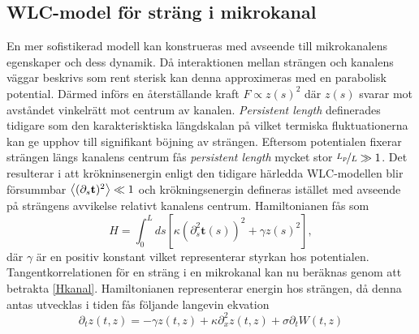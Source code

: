 \subsection{WLC-model för sträng i mikrokanal}

En mer sofistikerad modell kan konstrueras med avseende till mikrokanalens egenskaper och dess dynamik. Då interaktionen mellan strängen och kanalens väggar beskrivs som rent sterisk \cite{Koster_etal2007} kan denna approximeras med en parabolisk potential. Därmed införs en återställande kraft $F \propto z(s)^2$ där $z(s)$ svarar mot avståndet vinkelrätt mot centrum av kanalen. \emph{Persistent length} definerades tidigare som den karakterisktiska längdskalan på vilket termiska fluktuationerna kan ge upphov till signifikant böjning av strängen. Eftersom potentialen fixerar strängen längs kanalens centrum fås \emph{persistent length} mycket stor $\nicefrac{L_{p}}{L}\gg 1$. Det resulterar i att krökninsenergin enligt den tidigare härledda WLC-modellen blir försummbar \cite{PhysRevE.60.4671} $\ev{(\partial_{s}\mathbf{t})^2}\ll 1$ och  krökningsenergin defineras istället med avseende på strängens avvikelse relativt kanalens centrum. Hamiltonianen fås som
\begin{equation}
\label{Hkanal}
    H=\int_{0}^{L}ds[\kappa(\partial_{s}^2\mathbf{t}(s))^2+ \gamma z(s)^2],
\end{equation}
där $\gamma$ är en positiv konstant vilket representerar styrkan hos potentialen.\\
Tangentkorrelationen för en sträng i en mikrokanal kan nu beräknas genom att betrakta \eqref{Hkanal}. Hamiltonianen representerar energin hos strängen, då denna antas utvecklas i tiden fås följande langevin ekvation
\begin{equation}
\label{mans}
    \partial_{t}z(t,z)=-\gamma z(t,z)+\kappa \partial_{x}^{2}z(t,z)+\sigma \partial_{t}W(t,z)
\end{equation}
